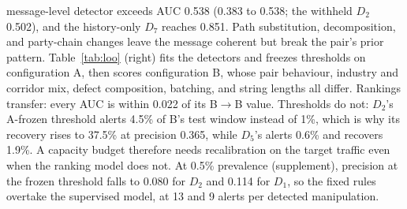 \documentclass[conference]{IEEEtran}
\begin{document}
message-level detector exceeds AUC 0.538 (0.383 to 0.538; the
withheld $D_2$ 0.502), and the history-only $D_7$ reaches 0.851.
Path substitution, decomposition, and party-chain changes leave the message
coherent but break the pair's prior pattern. Table~\ref{tab:loo} (right) fits the detectors and freezes thresholds on
configuration A, then scores configuration B, whose pair behaviour, industry
and corridor mix, defect composition, batching, and string lengths all
differ. Rankings transfer: every AUC is within 0.022 of its
B$\rightarrow$B value. Thresholds do not: $D_2$'s A-frozen threshold alerts
4.5\% of B's test window instead of 1\%, which is why its
recovery rises to 37.5\% at precision 0.365,
while $D_5$'s alerts 0.6\% and recovers
1.9\%. A capacity budget therefore needs recalibration on
the target traffic even when the ranking model does not. At 0.5\% prevalence
(supplement), precision at the frozen threshold falls to
0.080 for $D_2$ and 0.114 for $D_1$, so the
fixed rules overtake the supervised model, at 13 and
9 alerts per detected manipulation.
\end{document}
